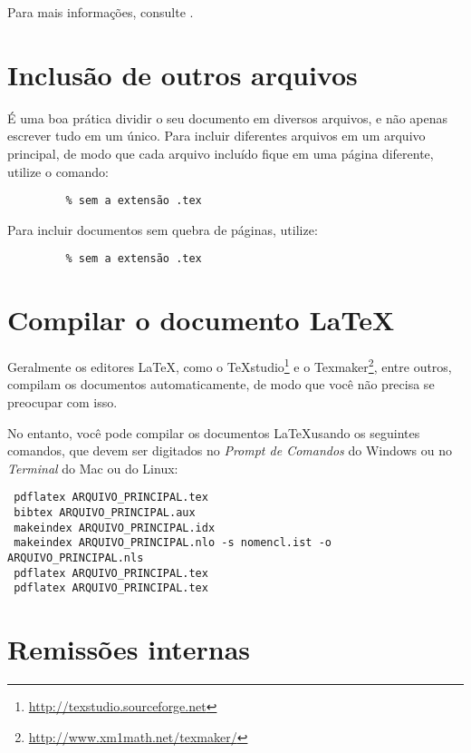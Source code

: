 \documentclass[article,12pt,oneside,a4paper,chapter=TITLE,
			   english,brazil]{abntex2}
\begin{document}
\begin{anexosenv}
Para mais informações, consulte .


\section{Inclusão de outros arquivos}\label{sec-include}

É uma boa prática dividir o seu documento em diversos arquivos, e não apenas escrever tudo em um único. Para incluir diferentes arquivos em um arquivo principal, de modo que cada arquivo incluído fique em uma página diferente, utilize o comando:
\begin{verbatim}
         % sem a extensão .tex
\end{verbatim}

Para incluir documentos sem quebra de páginas, utilize:
\begin{verbatim}
         % sem a extensão .tex
\end{verbatim}


\section{Compilar o documento \LaTeX}

Geralmente os editores \LaTeX, como o TeXstudio\footnote{\url{http://texstudio.sourceforge.net}} e o Texmaker\footnote{\url{http://www.xm1math.net/texmaker/}}, entre outros, compilam os documentos automaticamente, de modo que você não precisa se preocupar com isso.

No entanto, você pode compilar os documentos \LaTeX usando os seguintes comandos, que devem ser digitados no \emph{Prompt de Comandos} do Windows ou no \emph{Terminal} do Mac ou do Linux:
\begin{verbatim}
 pdflatex ARQUIVO_PRINCIPAL.tex
 bibtex ARQUIVO_PRINCIPAL.aux
 makeindex ARQUIVO_PRINCIPAL.idx 
 makeindex ARQUIVO_PRINCIPAL.nlo -s nomencl.ist -o ARQUIVO_PRINCIPAL.nls
 pdflatex ARQUIVO_PRINCIPAL.tex
 pdflatex ARQUIVO_PRINCIPAL.tex
\end{verbatim}


\section{Remissões internas}


\end{anexosenv}
\end{document}
